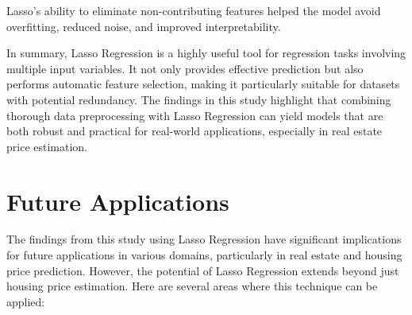 \documentclass[12pt, a4paper]{report}
\begin{document}
Lasso’s ability to eliminate non-contributing features helped the model avoid overfitting, reduced noise, and improved interpretability.

In summary, Lasso Regression is a highly useful tool for regression tasks involving multiple input variables. It not only provides effective prediction but also performs automatic feature selection, making it particularly suitable for datasets with potential redundancy. The findings in this study highlight that combining thorough data preprocessing with Lasso Regression can yield models that are both robust and practical for real-world applications, especially in real estate price estimation.


\section{Future Applications}

The findings from this study using Lasso Regression have significant implications for future applications in various domains, particularly in real estate and housing price prediction. However, the potential of Lasso Regression extends beyond just housing price estimation. Here are several areas where this technique can be applied:
\end{document}

